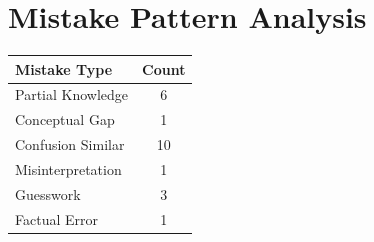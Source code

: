 \documentclass[a4paper,12pt]{article}
\begin{document}
\section{Mistake Pattern Analysis}
\begin{center}
\begin{tabular}{|l|c|}
\hline
\textbf{Mistake Type} & \textbf{Count} \\
\hline
Partial Knowledge & 6 \\
\hline
Conceptual Gap & 1 \\
\hline
Confusion Similar & 10 \\
\hline
Misinterpretation & 1 \\
\hline
Guesswork & 3 \\
\hline
Factual Error & 1 \\
\hline
\end{tabular}
\end{center}
\end{document}
